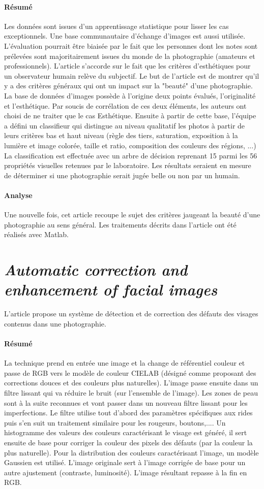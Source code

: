 \documentclass[11pt, french,screen]{report-rd-info}
\begin{document}
\paragraph{Résumé}
Les données sont issues d'un apprentissage statistique pour lisser les cas exceptionnels. Une base communautaire d'échange d'images est aussi utilisée. L'évaluation pourrait être biaisée par le fait que les personnes dont les notes sont prélevées sont majoritairement issues du monde de la photographie (amateurs et professionnels). L'article s'accorde sur le fait que les critères d'esthétiques pour un observateur humain relève du subjectif. Le but de l'article est de montrer qu'il y a des critères généraux qui ont un impact sur la "beauté" d'une photographie. La base de données d'images possède à l'origine deux points évalués, l'originalité et l'esthétique. Par soucis de corrélation de ces deux éléments, les auteurs ont choisi de ne traiter que le cas Esthétique.
Ensuite à partir de cette base, l'équipe a défini un classifieur qui distingue au niveau qualitatif les photos à partir de leurs critères bas et haut niveau (règle des tiers, saturation, exposition à la lumière et image colorée, taille et ratio, composition des couleurs des régions, ...)
La classification est effectuée avec un arbre de décision reprenant 15 parmi les 56 propriétés visuelles retenues par le laboratoire. Les résultats seraient en mesure de déterminer si une photographie serait jugée belle ou non par un humain.
\paragraph{Analyse}
Une nouvelle fois, cet article recoupe le sujet des critères jaugeant la beauté d'une photographie au sens général. Les traitements décrits dans l’article ont été réalisés avec Matlab.
\section{\emph{Automatic correction and enhancement of facial images}}
L'article \cite{Konoplev2012} propose un système de détection et de correction des défauts des visages contenus dans une photographie.
\paragraph{Résumé}
La technique prend en entrée une image et la change de référentiel couleur et passe de RGB vers le modèle de couleur CIELAB (désigné comme proposant des corrections douces et des couleurs plus naturelles). L'image passe ensuite dans un filtre lissant qui va réduire le bruit (sur l’ensemble de l’image). Les zones de peau sont à la suite reconnues et vont passer dans un nouveau filtre lissant pour les imperfections.
Le filtre utilise tout d'abord des paramètres spécifiques aux rides puis s'en suit un traitement similaire pour les rougeurs, boutons,.... Un histogramme des valeurs des couleurs caractérisant le visage est généré, il sert ensuite de base pour corriger la couleur des pixels des défauts (par la couleur la plus naturelle). Pour la distribution des couleurs caractérisant l'image, un modèle Gaussien est utilisé. L’image originale sert à l'image corrigée de base pour un autre ajustement (contraste, luminosité). L'image résultant repasse à la fin en RGB.
\end{document}
